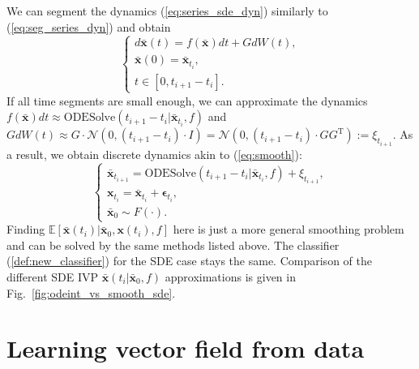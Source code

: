 \documentclass[referee, pdflatex, sn-mathphys-num]{sn-jnl}
\theoremstyle{definition}
\theoremstyle{plain}
\newcommand{\bx}{\ensuremath{\mathbf{x}}}
\newcommand{\bbx}{\ensuremath{\bar{\mathbf{x}}}}
\newcommand{\beps}{\ensuremath{\boldsymbol{\epsilon}}}
\begin{document}
	We can segment the dynamics (\ref{eq:series_sde_dyn}) similarly to (\ref{eq:seg_series_dyn}) and obtain
	\begin{equation}
		\begin{cases}\label{eq:seg_series_sde_dyn}
			d\bbx(t) = f(\bbx)dt + G dW(t), \\
			\bbx(0) = \bbx_{t_i}, \\
			t \in [0, t_{i+1} - t_i].
		\end{cases}
	\end{equation}
	If all time segments are small enough, we can approximate the dynamics $f(\bbx)dt \approx \text{ODESolve}(t_{i+1} - t_i | \bbx_{t_i}, f)$ and $G dW(t) \approx G \cdot \mathcal{N}(0, (t_{i+1} - t_i) \cdot  I) = \mathcal{N}(0, (t_{i+1} - t_i) \cdot G G^{\text{T}}) := \xi_{t_{i+1}}$. As a result, we obtain discrete dynamics akin to (\ref{eq:smooth}):
	\begin{equation}\label{eq:smooth_sde}
		\begin{cases}
			\bbx_{t_{i+1}} = \text{ODESolve}(t_{i+1} - t_i | \bbx_{t_i}, f) + \xi_{t_{i+1}}, \\
			\bx_{t_i} = \bbx_{t_i} + \beps_{t_i}, \\
			\bbx_0 \sim F(\cdot).
		\end{cases}
	\end{equation}
	Finding $\mathbb{E}[\bbx(t_i) | \bbx_0, \bx(t_i), f]$ here is just a more general smoothing problem and can be solved by the same methods listed above. The classifier (\ref{def:new_classifier}) for the SDE case stays the same. Comparison of the different SDE IVP $\bbx(t_i | \bbx_0, f)$ approximations is given in Fig.~\ref{fig:odeint_vs_smooth_sde}.
	
	\section{Learning vector field from data}\label{sec:learn_ode}
	
\end{document}
